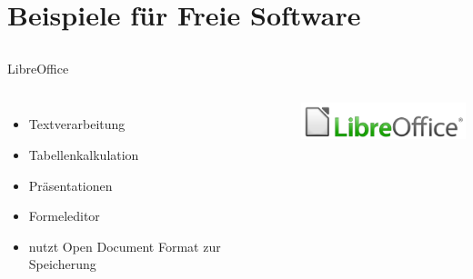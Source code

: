 \documentclass[12pt]{beamer}
\begin{document}
\section{Beispiele für Freie Software}


\subsection{}
\begin{frame}{LibreOffice}

\begin{columns}


\column{6cm}
\begin{itemize}
\item Textverarbeitung
\item Tabellenkalkulation
\item Präsentationen
\item Formeleditor
\item nutzt Open Document Format zur Speicherung
\end{itemize}

\column{5cm}


\begin{center}
\includegraphics[width=5cm]{img/LibreOffice}
\par\end{center}

\end{columns}
\end{frame}
\end{document}
